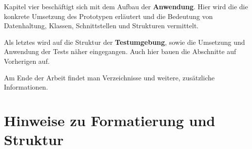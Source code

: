 \documentclass[
							a4paper, 
							11pt, 
							openany, 
							liststotoc,
							parskip=half, 
   							headings=normal
						]{scrreprt}
\begin{document}
Kapitel vier beschäftigt sich mit dem Aufbau der \textbf{Anwendung}. Hier wird die die konkrete Umsetzung des Prototypen erläutert und die Bedeutung von Datenhaltung, Klassen, Schnittstellen und Strukturen vermittelt.

Als letztes wird auf die Struktur der \textbf{Testumgebung}, sowie die Umsetzung und Anwendung der Tests näher eingegangen. Auch hier bauen die Abschnitte auf Vorherigen auf.

Am Ende der Arbeit findet man Verzeichnisse und weitere, zusätzliche Informationen.

\section{Hinweise zu Formatierung und Struktur} \label{se:einleitung_struktur}
\end{document}
